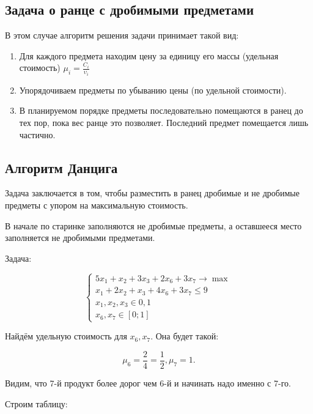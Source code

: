 \subsection{Задача о ранце с дробимыми предметами}

В этом случае алгоритм решения задачи принимает такой вид:

\begin{enumerate}
\item{Для каждого предмета находим цену за единицу его массы (удельная стоимость) $\mu_i = \frac {C_i} {\upsilon_i}$}

\item{Упорядочиваем предметы по убыванию цены (по удельной стоимости).}

\item{В планируемом порядке предметы последовательно помещаются в ранец до тех пор, пока вес ранце это позволяет. Последний предмет помещается лишь частично.}
\end{enumerate}

\subsection{Алгоритм Данцига}

Задача заключается в том, чтобы разместить в ранец дробимые и не дробимые предметы с упором на максимальную стоимость.

В начале по старинке заполняются не дробимые предметы, а оставшееся место заполняется не дробимыми предметами.

Задача:

$$
\left \{
\begin{aligned}
5 x_1 + x_2 + 3 x_3 + 2 x_6 + 3 x_7 \to \max \\
x_1 + 2 x_2 + x_3 + 4 x_6 + 3 x_7 \le 9 \\
x_1, x_2, x_3 \in {0, 1} \\
x_6, x_7 \in [0; 1]
\end{aligned}
\right.
$$

Найдём удельную стоимость для $x_6, x_7$. Она будет такой:

$$\mu_6=\frac {2} {4} = \frac {1} {2}, \mu_7 = 1.$$

Видим, что 7-й продукт более дорог чем 6-й и начинать надо именно с 7-го.

Строим таблицу:

